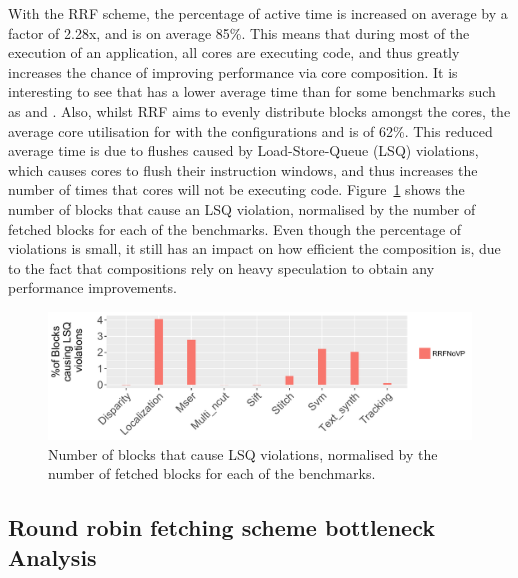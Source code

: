 With the RRF scheme, the percentage of active time is increased on average by a factor of 2.28x, and is on average 85\%.
This means that during most of the execution of an application, all cores are executing code, and thus greatly increases the chance of improving performance via core composition.
It is interesting to see that \nfvp{} has a lower average time than \nfnovp{} for some benchmarks such as  and .
Also, whilst RRF aims to evenly distribute blocks amongst the cores, the average core utilisation for  with the configurations \nfnovp{} and \nfvp{} is of 62\%.
This reduced average time is due to flushes caused by Load-Store-Queue (LSQ) violations, which causes cores to flush their instruction windows, and thus increases the number of times that cores will not be executing code.
Figure~\ref{fig:lsqvio} shows the number of blocks that cause an LSQ violation, normalised by the number of fetched blocks for each of the benchmarks.
Even though the percentage of violations is small, it still has an impact on how efficient the composition is, due to the fact that compositions rely on heavy speculation to obtain any performance improvements.
\begin{figure}[t]
    \centering
    \includegraphics[width=1\textwidth]{chapter3/graphics/lsqViol4.pdf}
    \caption{Number of blocks that cause LSQ violations, normalised by the number of fetched blocks for each of the benchmarks.}
    \label{fig:lsqvio}
	\vspace{1em}
\end{figure}


\subsection{Round robin fetching scheme bottleneck Analysis}

